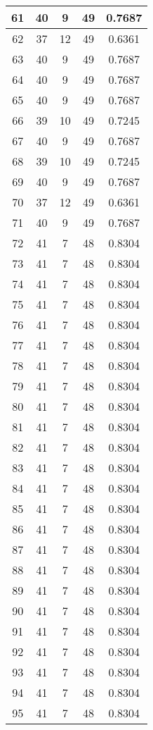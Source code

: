 \documentclass[letterpaper, 12pt]{article}
\begin{document}
\begin{longtable}{|c|c|c|c|c|}
61 & 40 & 9 & 49 & 0.7687 \\
\hline
62 & 37 & 12 & 49 & 0.6361 \\
\hline
63 & 40 & 9 & 49 & 0.7687 \\
\hline
64 & 40 & 9 & 49 & 0.7687 \\
\hline
65 & 40 & 9 & 49 & 0.7687 \\
\hline
66 & 39 & 10 & 49 & 0.7245 \\
\hline
67 & 40 & 9 & 49 & 0.7687 \\
\hline
68 & 39 & 10 & 49 & 0.7245 \\
\hline
69 & 40 & 9 & 49 & 0.7687 \\
\hline
70 & 37 & 12 & 49 & 0.6361 \\
\hline
71 & 40 & 9 & 49 & 0.7687 \\
\hline
72 & 41 & 7 & 48 & 0.8304 \\
\hline
73 & 41 & 7 & 48 & 0.8304 \\
\hline
74 & 41 & 7 & 48 & 0.8304 \\
\hline
75 & 41 & 7 & 48 & 0.8304 \\
\hline
76 & 41 & 7 & 48 & 0.8304 \\
\hline
77 & 41 & 7 & 48 & 0.8304 \\
\hline
78 & 41 & 7 & 48 & 0.8304 \\
\hline
79 & 41 & 7 & 48 & 0.8304 \\
\hline
80 & 41 & 7 & 48 & 0.8304 \\
\hline
81 & 41 & 7 & 48 & 0.8304 \\
\hline
82 & 41 & 7 & 48 & 0.8304 \\
\hline
83 & 41 & 7 & 48 & 0.8304 \\
\hline
84 & 41 & 7 & 48 & 0.8304 \\
\hline
85 & 41 & 7 & 48 & 0.8304 \\
\hline
86 & 41 & 7 & 48 & 0.8304 \\
\hline
87 & 41 & 7 & 48 & 0.8304 \\
\hline
88 & 41 & 7 & 48 & 0.8304 \\
\hline
89 & 41 & 7 & 48 & 0.8304 \\
\hline
90 & 41 & 7 & 48 & 0.8304 \\
\hline
91 & 41 & 7 & 48 & 0.8304 \\
\hline
92 & 41 & 7 & 48 & 0.8304 \\
\hline
93 & 41 & 7 & 48 & 0.8304 \\
\hline
94 & 41 & 7 & 48 & 0.8304 \\
\hline
95 & 41 & 7 & 48 & 0.8304 \\

\end{longtable}
\end{document}
